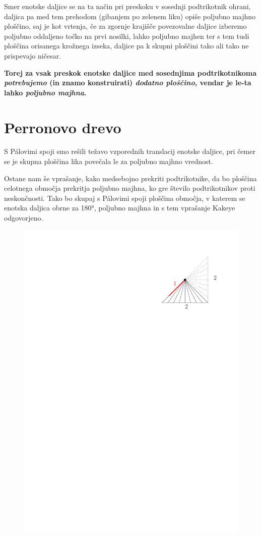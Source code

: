 \documentclass[a4paper, 12pt]{article}
\begin{document}
Smer enotske daljice se na ta način pri preskoku v sosednji podtrikotnik ohrani, daljica pa med tem prehodom (gibanjem po zelenem liku) opiše poljubno majhno ploščino, saj je kot vrtenja, če za zgornje krajišče povezovalne daljice izberemo poljubno oddaljeno točko na prvi nosilki, lahko poljubno majhen ter s tem tudi ploščina orisanega krožnega izseka, daljice pa k skupni ploščini tako ali tako ne prispevajo ničesar.

\textbf{Torej za vsak preskok enotske daljice med sosednjima podtrikotnikoma \emph{potrebujemo} (in znamo konstruirati) \emph{dodatno ploščino}, vendar je le-ta lahko \emph{poljubno majhna}.}


\section*{Perronovo drevo}

S Pálovimi spoji smo rešili težavo vzporednih translacij enotske daljice, pri čemer se je skupna ploščina lika povečala le za poljubno majhno vrednost.

Ostane nam še vprašanje, kako medsebojno prekriti podtrikotnike, da bo ploščina celotnega območja prekritja poljubno majhna, ko gre število podtrikotnikov proti neskončnosti. Tako bo skupaj s Pálovimi spoji ploščina območja, v katerem se enotska daljica obrne za 180°, poljubno majhna in s tem vprašanje Kakeye odgovorjeno.

\begin{figure}
    \includegraphics[width=0.9\linewidth]{ipe_slike/polovica_trikotnika.pdf}
\end{figure}
\end{document}
